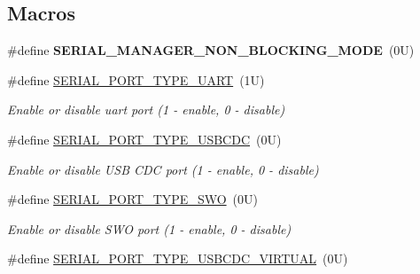 \subsection*{Macros}
\begin{DoxyCompactItemize}
\item 
\mbox{\label{group__serialmanager_gabf238ccb327fd5316f765109d1235ae3}} 
\#define {\bfseries S\+E\+R\+I\+A\+L\+\_\+\+M\+A\+N\+A\+G\+E\+R\+\_\+\+N\+O\+N\+\_\+\+B\+L\+O\+C\+K\+I\+N\+G\+\_\+\+M\+O\+DE}~(0\+U)
\item 
\mbox{\label{group__serialmanager_ga58308509c0f8d97f157a3f9eb5d72ce2}} 
\#define \mbox{\hyperlink{group__serialmanager_ga58308509c0f8d97f157a3f9eb5d72ce2}{S\+E\+R\+I\+A\+L\+\_\+\+P\+O\+R\+T\+\_\+\+T\+Y\+P\+E\+\_\+\+U\+A\+RT}}~(1\+U)
\begin{DoxyCompactList}\small\item\em Enable or disable uart port (1 -\/ enable, 0 -\/ disable) \end{DoxyCompactList}\item 
\mbox{\label{group__serialmanager_gaf2e3166c5915cc3c3669d158da08cd51}} 
\#define \mbox{\hyperlink{group__serialmanager_gaf2e3166c5915cc3c3669d158da08cd51}{S\+E\+R\+I\+A\+L\+\_\+\+P\+O\+R\+T\+\_\+\+T\+Y\+P\+E\+\_\+\+U\+S\+B\+C\+DC}}~(0\+U)
\begin{DoxyCompactList}\small\item\em Enable or disable U\+SB C\+DC port (1 -\/ enable, 0 -\/ disable) \end{DoxyCompactList}\item 
\mbox{\label{group__serialmanager_ga7c73031b5ccec048199e131e3b4eaafc}} 
\#define \mbox{\hyperlink{group__serialmanager_ga7c73031b5ccec048199e131e3b4eaafc}{S\+E\+R\+I\+A\+L\+\_\+\+P\+O\+R\+T\+\_\+\+T\+Y\+P\+E\+\_\+\+S\+WO}}~(0\+U)
\begin{DoxyCompactList}\small\item\em Enable or disable S\+WO port (1 -\/ enable, 0 -\/ disable) \end{DoxyCompactList}\item 
\mbox{\label{group__serialmanager_ga1e748beb3f0b463fee6acf6b35ae06ac}} 
\#define \mbox{\hyperlink{group__serialmanager_ga1e748beb3f0b463fee6acf6b35ae06ac}{S\+E\+R\+I\+A\+L\+\_\+\+P\+O\+R\+T\+\_\+\+T\+Y\+P\+E\+\_\+\+U\+S\+B\+C\+D\+C\+\_\+\+V\+I\+R\+T\+U\+AL}}~(0\+U)

\end{DoxyCompactItemize}
